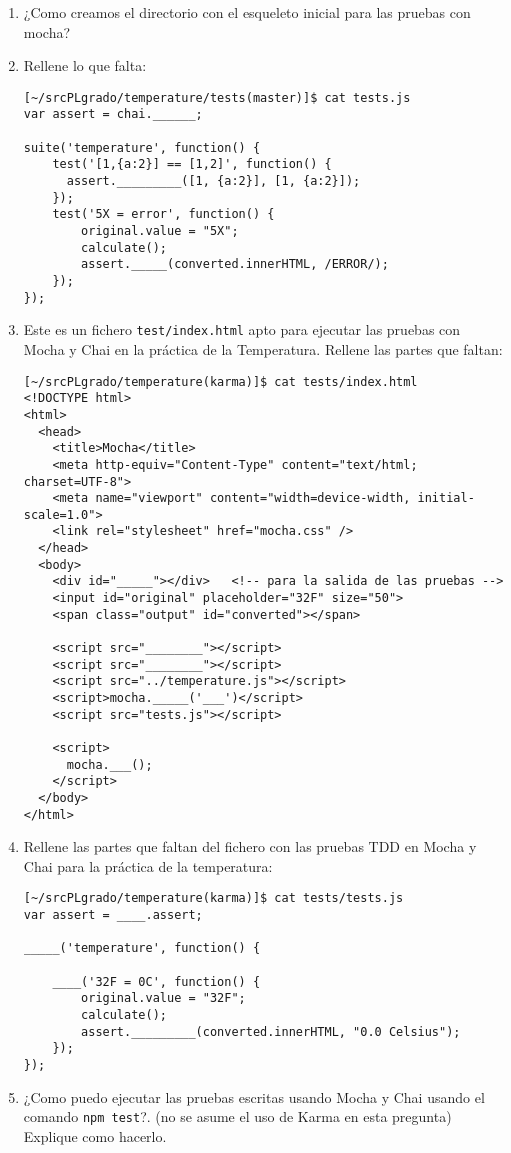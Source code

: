 \documentclass[spanish,a4paper,11pt]{article}
\begin{document}
\begin{enumerate}
\item 
¿Como creamos el directorio con el esqueleto inicial para las pruebas con mocha?
\item Rellene lo que falta:
\begin{verbatim}
[~/srcPLgrado/temperature/tests(master)]$ cat tests.js 
var assert = chai.______;

suite('temperature', function() {
    test('[1,{a:2}] == [1,2]', function() {
      assert._________([1, {a:2}], [1, {a:2}]);
    });
    test('5X = error', function() {
        original.value = "5X";
        calculate();
        assert._____(converted.innerHTML, /ERROR/);
    });
});
\end{verbatim}
\item 
Este es un fichero \verb|test/index.html| apto para ejecutar las pruebas con Mocha y Chai
en la práctica de la Temperatura. Rellene las partes que faltan:
\begin{verbatim}
[~/srcPLgrado/temperature(karma)]$ cat tests/index.html 
<!DOCTYPE html>
<html>
  <head>
    <title>Mocha</title>
    <meta http-equiv="Content-Type" content="text/html; charset=UTF-8">
    <meta name="viewport" content="width=device-width, initial-scale=1.0">
    <link rel="stylesheet" href="mocha.css" />
  </head>
  <body>
    <div id="_____"></div>   <!-- para la salida de las pruebas -->
    <input id="original" placeholder="32F" size="50">
    <span class="output" id="converted"></span>

    <script src="________"></script>
    <script src="________"></script>
    <script src="../temperature.js"></script>
    <script>mocha._____('___')</script>
    <script src="tests.js"></script>

    <script>
      mocha.___();
    </script>
  </body>
</html>
\end{verbatim}
\item  Rellene las partes que faltan del fichero con las pruebas TDD
en Mocha y Chai para la práctica de la temperatura:
\begin{verbatim}
[~/srcPLgrado/temperature(karma)]$ cat tests/tests.js 
var assert = ____.assert;

_____('temperature', function() {

    ____('32F = 0C', function() {
        original.value = "32F";
        calculate();
        assert._________(converted.innerHTML, "0.0 Celsius");
    });
});
\end{verbatim}
\item 
¿Como puedo ejecutar las pruebas escritas usando Mocha y Chai
usando el comando \verb|npm test|?. (no se asume el uso de Karma en esta pregunta)
Explique como hacerlo.
\end{enumerate}
\end{document}
